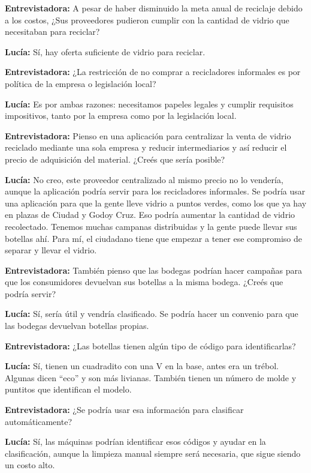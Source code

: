 \textbf{Entrevistadora:} A pesar de haber disminuido la meta anual de reciclaje debido a los costos, ¿Sus proveedores pudieron cumplir con la cantidad de vidrio que necesitaban para reciclar?

\textbf{Lucía:} Sí, hay oferta suficiente de vidrio para reciclar.

\textbf{Entrevistadora:} ¿La restricción de no comprar a recicladores informales es por política de la empresa o legislación local?

\textbf{Lucía:} Es por ambas razones: necesitamos papeles legales y cumplir requisitos impositivos, tanto por la empresa como por la legislación local.

\textbf{Entrevistadora:} Pienso en una aplicación para centralizar la venta de vidrio reciclado mediante una sola empresa y reducir intermediarios y así reducir el precio de adquisición del material. ¿Creés que sería posible?

\textbf{Lucía:} No creo, este proveedor centralizado al mismo precio no lo vendería, aunque la aplicación podría servir para los recicladores informales. Se podría usar una aplicación para que la gente lleve vidrio a puntos verdes, como los que ya hay en plazas de Ciudad y Godoy Cruz. Eso podría aumentar la cantidad de vidrio recolectado. Tenemos muchas campanas distribuidas y la gente puede llevar sus botellas ahí. Para mí, el ciudadano tiene que empezar a tener ese compromiso de separar y llevar el vidrio.

\textbf{Entrevistadora:} También pienso que las bodegas podrían hacer campañas para que los consumidores devuelvan sus botellas a la misma bodega. ¿Creés que podría servir?

\textbf{Lucía:} Sí, sería útil y vendría clasificado. Se podría hacer un convenio para que las bodegas devuelvan botellas propias.

\textbf{Entrevistadora:} ¿Las botellas tienen algún tipo de código para identificarlas?

\textbf{Lucía:} Sí, tienen un cuadradito con una V en la base, antes era un trébol. Algunas dicen ``eco'' y son más livianas. También tienen un número de molde y puntitos que identifican el modelo.

\textbf{Entrevistadora:} ¿Se podría usar esa información para clasificar automáticamente?

\textbf{Lucía:} Sí, las máquinas podrían identificar esos códigos y ayudar en la clasificación, aunque la limpieza manual siempre será necesaria, que sigue siendo un costo alto.

